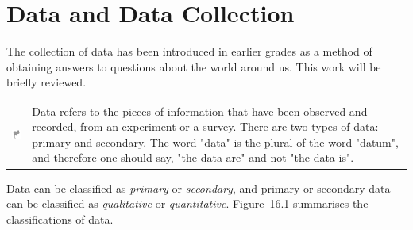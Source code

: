             \section{ Data and Data Collection}
            \nopagebreak
         \label{m39403*id200309}The collection of data has been introduced in earlier grades as a method of obtaining answers to questions about the world around us. This work will be briefly reviewed.\par 
%             
%           
\par
            \label{m39403*fhsst!!!underscore!!!id85}\begin{definition}
	  \begin{tabular*}{15 cm}{m{15 mm}m{}}
	\hspace*{-50pt}  \includegraphics[width=0.5in]{col11306.imgs/psflag2.png}   & \Definition{   \label{id2616525}\textbf{ Data }} { \label{m39403*meaningfhsst!!!underscore!!!id85}
          \label{m39403*id200337}Data refers to the pieces of information that have been observed and recorded, from an experiment or a survey. There are two types of data: primary and secondary. The word "data" is the plural of the word "datum", and therefore one should say, "the data are" and not "the data is". \par 
           } 
      \end{tabular*}
      \end{definition}
          \label{m39403*id200350}Data can be classified as \textsl{primary} or \textsl{secondary}, and primary or secondary data can be classified as \textsl{qualitative} or \textsl{quantitative}. Figure~16.1 summarises the classifications of data.\par 
    \setcounter{subfigure}{0}
